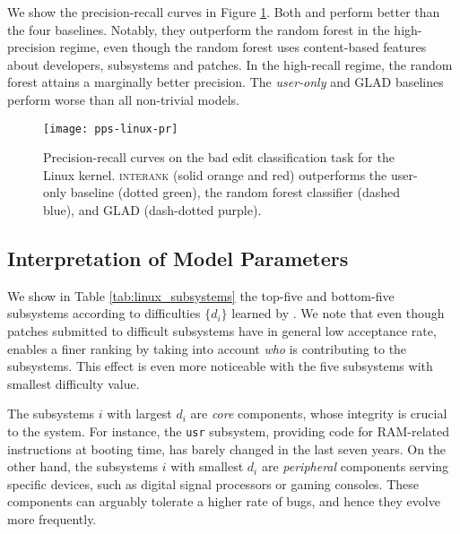 We show the precision-recall curves in Figure \ref{fig:linux_results}.
Both  and  perform better than the four baselines.
Notably, they outperform the random forest in the high-precision regime, even though the random forest uses content-based features about developers, subsystems and patches.
In the high-recall regime, the random forest attains a marginally better precision.
The \emph{user-only} and GLAD baselines perform worse than all non-trivial models.

\begin{figure}
	\texttt{[image: pps-linux-pr]}
	\caption{Precision-recall curves on the bad edit classification task for the Linux kernel. \textsc{interank} (solid orange and red) outperforms the user-only baseline (dotted green), the random forest classifier (dashed blue), and GLAD (dash-dotted purple).}
	\label{fig:linux_results}
\end{figure}

\subsection{Interpretation of Model Parameters}

We show in Table \ref{tab:linux_subsystems} the top-five and bottom-five subsystems according to  difficulties $\{d_i\}$ learned by .
We note that even though patches submitted to difficult subsystems have in general low acceptance rate, \interank{} enables a finer ranking by taking into account \emph{who} is contributing to the subsystems.
This effect is even more noticeable with the five subsystems with smallest difficulty value.

The subsystems $i$ with largest $d_i$ are \emph{core} components, whose integrity is crucial to the system.
For instance, the \texttt{usr} subsystem, providing code for RAM-related instructions at booting time, has barely changed in the last seven years.
On the other hand, the subsystems $i$ with smallest $d_i$ are \textit{peripheral} components serving specific devices, such as digital signal processors or gaming consoles.
These components can arguably tolerate a higher rate of bugs, and hence they evolve more frequently.

